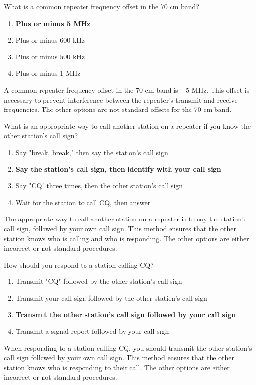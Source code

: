 \begin{tcolorbox}[colback=gray!10!white,colframe=black!75!black,title={T2A03}]
What is a common repeater frequency offset in the 70 cm band?
\begin{enumerate}[label=\Alph*,noitemsep]
    \item \textbf{Plus or minus 5 MHz}
    \item Plus or minus 600 kHz
    \item Plus or minus 500 kHz
    \item Plus or minus 1 MHz
\end{enumerate}
\end{tcolorbox}
A common repeater frequency offset in the 70 cm band is $\pm 5$ MHz. This offset is necessary to prevent interference between the repeater's transmit and receive frequencies. The other options are not standard offsets for the 70 cm band.

\begin{tcolorbox}[colback=gray!10!white,colframe=black!75!black,title={T2A04}]
What is an appropriate way to call another station on a repeater if you know the other station's call sign?
\begin{enumerate}[label=\Alph*,noitemsep]
    \item Say "break, break," then say the station's call sign
    \item \textbf{Say the station's call sign, then identify with your call sign}
    \item Say "CQ" three times, then the other station's call sign
    \item Wait for the station to call CQ, then answer
\end{enumerate}
\end{tcolorbox}
The appropriate way to call another station on a repeater is to say the station's call sign, followed by your own call sign. This method ensures that the other station knows who is calling and who is responding. The other options are either incorrect or not standard procedures.

\begin{tcolorbox}[colback=gray!10!white,colframe=black!75!black,title={T2A05}]
How should you respond to a station calling CQ?
\begin{enumerate}[label=\Alph*,noitemsep]
    \item Transmit "CQ" followed by the other station’s call sign
    \item Transmit your call sign followed by the other station’s call sign
    \item \textbf{Transmit the other station’s call sign followed by your call sign}
    \item Transmit a signal report followed by your call sign
\end{enumerate}
\end{tcolorbox}
When responding to a station calling CQ, you should transmit the other station’s call sign followed by your own call sign. This method ensures that the other station knows who is responding to their call. The other options are either incorrect or not standard procedures.


